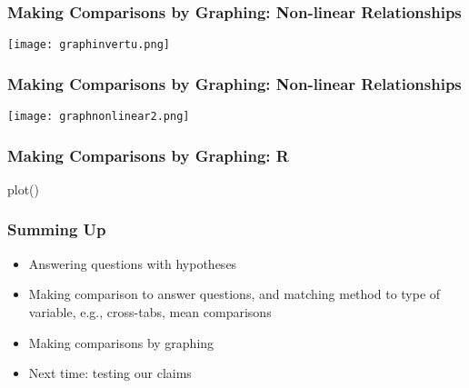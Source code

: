 \documentclass{beamer}
\begin{document}
\begin{frame}
 \frametitle{Making Comparisons by Graphing: Non-linear Relationships}
 \begin{center}
 \texttt{[image: graphinvertu.png]}
 \end{center}
\end{frame}

\begin{frame}
 \frametitle{Making Comparisons by Graphing: Non-linear Relationships}
 \begin{center}
 \texttt{[image: graphnonlinear2.png]}
 \end{center}
\end{frame}

\begin{frame}
 \frametitle{Making Comparisons by Graphing: R}
 plot()
\end{frame}

\begin{frame}
 \frametitle<+->{Summing Up}
 \begin{itemize}[<+->]
       \item Answering questions with \alert{hypotheses}
       \item Making comparison to answer questions, and matching method to type of variable, e.g., cross-tabs, mean comparisons
       \item Making comparisons by graphing
       \item Next time: testing our claims
 \end{itemize}
\end{frame}

%


%

\end{document}
